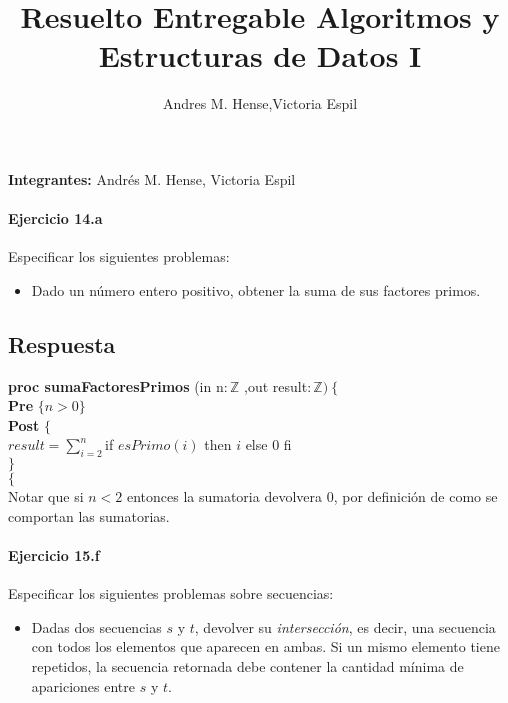 \documentclass[a4paper]{article}
\title{Resuelto Entregable Algoritmos y Estructuras de Datos I}
\author{Andres M. Hense,Victoria Espil}
\date{} %
\begin{document}




\begin{center}
\textbf{Integrantes:} Andrés M. Hense, Victoria Espil
\end{center}

\paragraph*{Ejercicio 14.a} Especificar los siguientes problemas:
	\begin{itemize}
		\item Dado un número entero positivo, obtener la suma de sus factores primos.
	\end{itemize}
	
\subsection*{Respuesta}

			\textbf{proc sumaFactoresPrimos }(in n$:\mathbb{Z}$
				,out result$: \mathbb{Z} )\ \{$\smallskip \\
			\hspace*{6mm} \textbf{Pre }$\{n>0 \}$\smallskip \\
			\hspace*{6mm} \textbf{Post }$\{$\\
			\hspace*{6mm} $result=\sum_{i=2}^{n}$if $esPrimo(i)$ then $i$ else 0 fi\\
			\hspace*{6mm} $\}$\\
			$\{$\smallskip \\
			
Notar que si $n<2$ entonces la sumatoria devolvera 0, por definición de como se comportan las 
sumatorias.
			
\paragraph*{Ejercicio 15.f} Especificar los siguientes problemas sobre secuencias:
	\begin{itemize}
		\item Dadas dos secuencias $s$ y $t$, devolver su \textit{intersección}, es
				decir, una secuencia con todos los elementos que aparecen en ambas. Si un mismo
				elemento tiene repetidos, la secuencia retornada debe contener la cantidad
				mínima de apariciones entre $s$ y $t$.
	\end{itemize}
\end{document}
